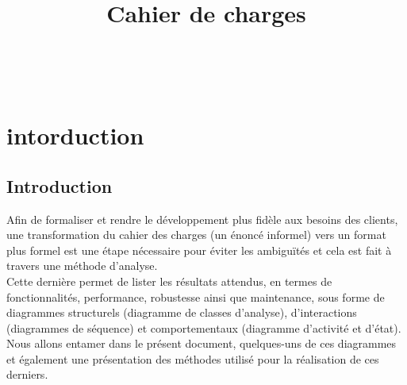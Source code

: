 \documentclass[11pt,fleqn]{book} %
\begin{document}
\title{Cahier de charges}

\begingroup
{}
\endgroup


\newpage
~\vfill
\thispagestyle{empty}




\pagestyle{empty} %

\tableofcontents %


\pagestyle{fancy} %


\chapter{intorduction}
\section{Introduction}
Afin de formaliser et rendre le développement plus fidèle aux besoins des clients, une transformation du cahier des charges (un énoncé informel) vers un format plus formel est une étape nécessaire pour éviter les ambiguïtés et cela est fait à travers une 
méthode d’analyse. \\
Cette dernière permet de lister les résultats attendus, en termes de fonctionnalités, performance, robustesse ainsi que maintenance, sous forme de diagrammes structurels (diagramme de classes d’analyse), d’interactions (diagrammes de séquence) et comportementaux (diagramme d’activité et d’état).\\
Nous allons entamer dans le présent document, quelques-uns de ces diagrammes et également une présentation des méthodes utilisé pour la réalisation de ces derniers.
\end{document}
